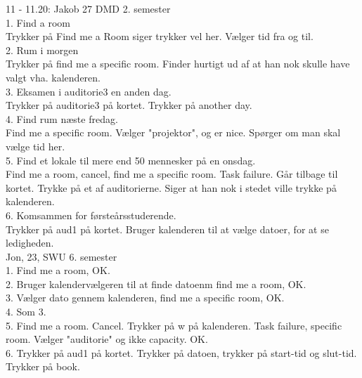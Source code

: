 11 - 11.20:	Jakob 27 DMD 2. semester\\



1. Find a room\\
Trykker på Find me a Room \- siger trykker vel her.
Vælger tid fra og til.\\


2. Rum i morgen\\
Trykker på find me a specific room. Finder hurtigt ud af at han nok skulle have valgt vha. kalenderen.\\


3. Eksamen i auditorie3 en anden dag.\\
Trykker på auditorie3 på kortet. Trykker på another day. \\


4. Find rum næste fredag.\\
Find me a specific room. Vælger "projektor", og er nice. Spørger om man skal vælge tid her.\\

5. Find et lokale til mere end 50 mennesker på en onsdag.\\
Find me a room, cancel, find me a specific room. Task failure. Går tilbage til kortet. Trykke på et af auditorierne. Siger at han nok i stedet ville trykke på kalenderen. \\


6. Komsammen for førsteårsstuderende.\\
Trykker på aud1 på kortet. Bruger kalenderen til at vælge datoer, for at se ledigheden.\\




Jon, 23, SWU 6. semester\\

1.
Find me a room, OK. \\


2.
Bruger kalendervælgeren til at finde datoenm find me a room, OK.\\


3.
Vælger dato gennem kalenderen, find me a specific room, OK.\\


4. 
Som 3. \\


5.
Find me a room. Cancel. Trykker på w på kalenderen. Task failure, specific room. Vælger "auditorie" og ikke capacity. OK. \\


6.
Trykker på aud1 på kortet. Trykker på datoen, trykker på start-tid og slut-tid. Trykker på book.

